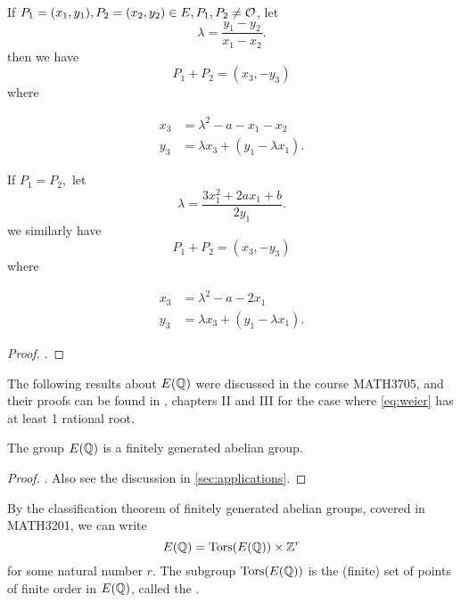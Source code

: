 \documentclass[12pt, a4paper]{report}
\begin{document}
\begin{prop}
  If $P_1 = (x_1,y_1), P_2 = (x_2,y_2) \in E, P_1, P_2 \neq {\mathcal O}$, let
  $$\lambda = \frac{y_1-y_2}{x_1-x_2}.$$
  then we have
  \[P_1 + P_2 = (x_3,-y_3)\]
  where

  \begin{equation} \label{eq:adddiff}
    \begin{split}
      x_3 &= \lambda^2 - a - x_1 - x_2 \\
      y_3 &= \lambda x_3 + (y_1 - \lambda x_1).
    \end{split}
  \end{equation}

  If $P_1 = P_2,$ let
  \[\lambda = \frac{3x_1^2 + 2ax_1 + b}{2y_1}.\]
  we similarly have
  \[P_1 + P_2 = (x_3,-y_3)\]
  where
  
  \begin{equation} \label {eq:addsim}
    \begin{split}
      x_3 &= \lambda^2 - a - 2x_1 \\
      y_3 &= \lambda x_3 + (y_1 - \lambda x_1).
    \end{split}
  \end{equation}
\end{prop}
\begin{proof}
  \cite[See][Chapter 1.7, page 34]{modular}.
\end{proof}

The following results about $E({\mathbb Q})$ were discussed in the course MATH3705,
and their proofs can be found in \cite{rational}, chapters II and III for the
case where \autoref{eq:weier} has at least 1 rational root.

\begin{thm}
  The group $E({\mathbb Q})$ is a finitely generated abelian group.
\end{thm}  
\begin{proof}
  \cite[See][Chapter III, pages 63-88]{rational}. Also see the discussion in
  \autoref{sec:applications}.
\end{proof}

By the classification theorem of finitely generated abelian groups, covered in
MATH3201, we can write
\begin{equation} \label{rankdefn}
E({\mathbb Q}) = {\text{\normalfont Tors}}(E({\mathbb Q})) \times {\mathbb Z}^r
\end{equation}
for some natural number $r$. The subgroup ${\text{\normalfont Tors}}(E({\mathbb Q}))$ is the (finite) set of
points of finite order in $E({\mathbb Q})$, called the .
\end{document}
